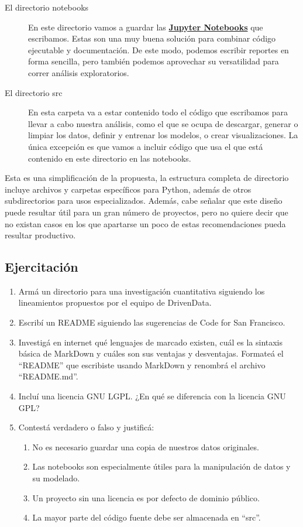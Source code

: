 \documentclass[12pt,spanish,a4paper,]{article}
\providecommand{\tightlist}{%
  \setlength{\itemsep}{0pt}\setlength{\parskip}{0pt}}
\begin{document}
\begin{description}
\item[El directorio notebooks]
En este directorio vamos a guardar las
\textbf{\href{https://jupyter.org/}{Jupyter Notebooks}} que escribamos.
Estas son una muy buena solución para combinar código ejecutable y
documentación. De este modo, podemos escribir reportes en forma
sencilla, pero también podemos aprovechar su versatilidad para correr
análisis exploratorios.
\item[El directorio src]
En esta carpeta va a estar contenido todo el código que escribamos para
llevar a cabo nuestra análisis, como el que se ocupa de descargar,
generar o limpiar los datos, definir y entrenar los modelos, o crear
visualizaciones. La única excepción es que vamos a incluir código que
usa el que está contenido en este directorio en las notebooks.
\end{description}

Esta es una simplificación de la propuesta, la estructura completa de
directorio incluye archivos y carpetas específicos para Python, además
de otros subdirectorios para usos especializados. Además, cabe señalar
que este diseño puede resultar útil para un gran número de proyectos,
pero no quiere decir que no existan casos en los que apartarse un poco
de estas recomendaciones pueda resultar productivo.

\hypertarget{ejercitacion-1}{%
\subsection{Ejercitación}\label{ejercitacion-1}}

\begin{enumerate}
\def\labelenumi{\arabic{enumi}.}
\tightlist
\item
  Armá un directorio para una investigación cuantitativa siguiendo los
  lineamientos propuestos por el equipo de DrivenData.
\item
  Escribí un README siguiendo las sugerencias de Code for San Francisco.
\item
  Investigá en internet qué lenguajes de marcado existen, cuál es la
  sintaxis básica de MarkDown y cuáles son sus ventajas y desventajas.
  Formateá el ``README'' que escribiste usando MarkDown y renombrá el
  archivo ``README.md''.
\item
  Incluí una licencia GNU LGPL. ¿En qué se diferencia con la licencia
  GNU GPL?
\item
  Contestá verdadero o falso y justificá:

  \begin{enumerate}
  \def\labelenumii{\alph{enumii}.}
  \tightlist
  \item
    No es necesario guardar una copia de nuestros datos originales.
  \item
    Las notebooks son especialmente útiles para la manipulación de datos
    y su modelado.
  \item
    Un proyecto sin una licencia es por defecto de dominio público.
  \item
    La mayor parte del código fuente debe ser almacenada en ``src''.
  \end{enumerate}
\end{enumerate}
\end{document}
